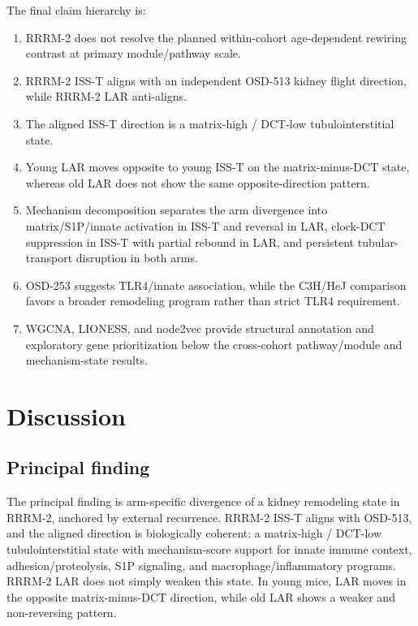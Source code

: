 \documentclass[11pt]{article}
\begin{document}
The final claim hierarchy is:
\begin{enumerate}
  \item RRRM-2 does not resolve the planned within-cohort age-dependent rewiring contrast at primary module/pathway scale.
  \item RRRM-2 ISS-T aligns with an independent OSD-513 kidney flight direction, while RRRM-2 LAR anti-aligns.
  \item The aligned ISS-T direction is a matrix-high / DCT-low tubulointerstitial state.
  \item Young LAR moves opposite to young ISS-T on the matrix-minus-DCT state, whereas old LAR does not show the same opposite-direction pattern.
  \item Mechanism decomposition separates the arm divergence into matrix/S1P/innate activation in ISS-T and reversal in LAR, clock-DCT suppression in ISS-T with partial rebound in LAR, and persistent tubular-transport disruption in both arms.
  \item OSD-253 suggests TLR4/innate association, while the C3H/HeJ comparison favors a broader remodeling program rather than strict TLR4 requirement.
  \item WGCNA, LIONESS, and node2vec provide structural annotation and exploratory gene prioritization below the cross-cohort pathway/module and mechanism-state results.
\end{enumerate}

\section{Discussion}

\subsection{Principal finding}

The principal finding is arm-specific divergence of a kidney remodeling state in RRRM-2, anchored by external recurrence. RRRM-2 ISS-T aligns with OSD-513, and the aligned direction is biologically coherent: a matrix-high / DCT-low tubulointerstitial state with mechanism-score support for innate immune context, adhesion/proteolysis, S1P signaling, and macrophage/inflammatory programs. RRRM-2 LAR does not simply weaken this state. In young mice, LAR moves in the opposite matrix-minus-DCT direction, while old LAR shows a weaker and non-reversing pattern.
\end{document}
